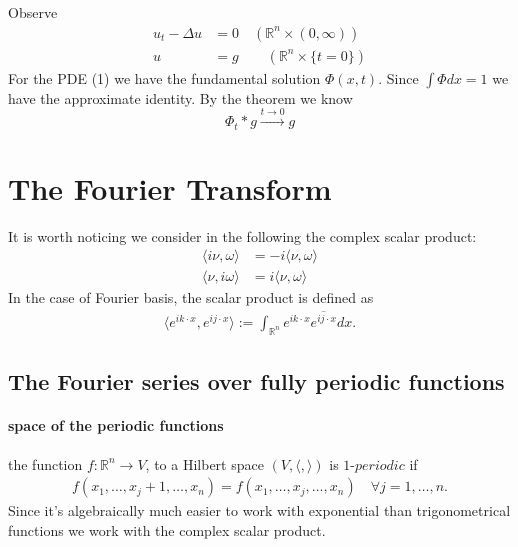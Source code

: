 \begin{example}
Observe
\begin{align}
	u_t - \Delta u &= 0 \quad (\mathbb{R}^n \times (0, \infty)) \\
	u &= g \quad \quad (\mathbb{R}^n \times \{t = 0\})
\end{align}	
For the PDE (1) we have the fundamental solution $\Phi(x, t)$. Since $\int \Phi dx = 1$ we have the approximate identity. By the theorem we know
\begin{equation*}
	\Phi_t * g \overset{t \rightarrow 0}{\longrightarrow} g 
\end{equation*}
\end{example}

\begin{example}
\end{example}


\newpage
\section{The Fourier Transform}
It is worth noticing we consider in the following the complex scalar product:
\begin{align*}
	\langle i\nu, \omega \rangle &= - i\langle \nu, \omega \rangle \\
	\langle \nu, i \omega \rangle &= i \langle \nu, \omega \rangle 
\end{align*}
In the case of Fourier basis, the scalar product is defined as
\begin{align*}
	\langle e^{ik \cdot x}, e^{ij \cdot x} \rangle:=  \int_{\mathbb{R}^n} e^{ik\cdot x} \overline{e^{ij \cdot x}} dx. 
\end{align*}


\subsection{The Fourier series over fully periodic functions}

\paragraph{space of the periodic functions}
\begin{definition}
	the function $f:\mathbb{R}^n \rightarrow V$, to a Hilbert space $(V,\langle, \rangle)$ is $1$-$periodic$ if 
	\begin{align*}
		f(x_1, \dots, x_j + 1, \dots, x_n) = f(x_1, \dots, x_j, \dots, x_n) \quad \forall j = 1, \dots, n. 
	\end{align*}
Since it's algebraically much easier to work with exponential than trigonometrical functions we work with the complex scalar product. 
\end{definition}

